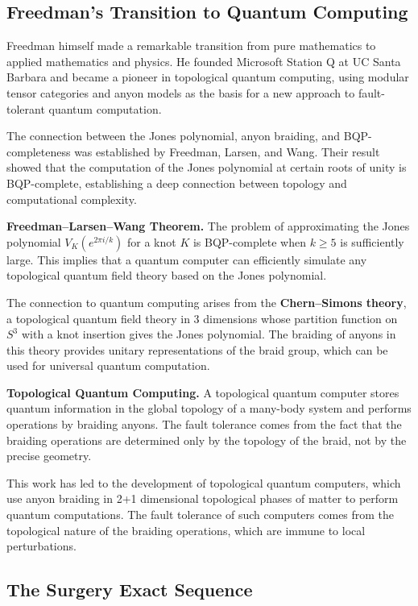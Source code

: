 \subsection*{Freedman's Transition to Quantum Computing}

Freedman himself made a remarkable transition from pure mathematics to applied mathematics and physics. He founded Microsoft Station Q at UC Santa Barbara and became a pioneer in topological quantum computing, using modular tensor categories and anyon models as the basis for a new approach to fault-tolerant quantum computation.

The connection between the Jones polynomial, anyon braiding, and BQP-completeness was established by Freedman, Larsen, and Wang. Their result showed that the computation of the Jones polynomial at certain roots of unity is BQP-complete, establishing a deep connection between topology and computational complexity.

\textbf{Freedman--Larsen--Wang Theorem.} The problem of approximating the Jones polynomial $V_K(e^{2\pi i / k})$ for a knot $K$ is BQP-complete when $k \geq 5$ is sufficiently large. This implies that a quantum computer can efficiently simulate any topological quantum field theory based on the Jones polynomial.

The connection to quantum computing arises from the \textbf{Chern--Simons theory}, a topological quantum field theory in 3 dimensions whose partition function on $S^3$ with a knot insertion gives the Jones polynomial. The braiding of anyons in this theory provides unitary representations of the braid group, which can be used for universal quantum computation.

\textbf{Topological Quantum Computing.} A topological quantum computer stores quantum information in the global topology of a many-body system and performs operations by braiding anyons. The fault tolerance comes from the fact that the braiding operations are determined only by the topology of the braid, not by the precise geometry.

This work has led to the development of topological quantum computers, which use anyon braiding in 2+1 dimensional topological phases of matter to perform quantum computations. The fault tolerance of such computers comes from the topological nature of the braiding operations, which are immune to local perturbations.

\subsection*{The Surgery Exact Sequence}

